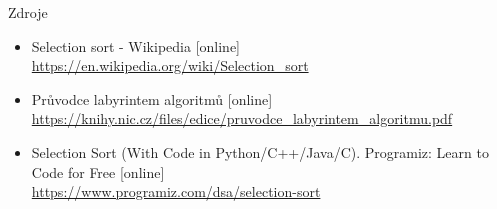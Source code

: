 \documentclass{beamer}
\begin{document}
\begin{frame}{Zdroje}
\begin{itemize}
    \item Selection sort - Wikipedia [online]\\
    \url{https://en.wikipedia.org/wiki/Selection_sort}
    \item Průvodce labyrintem algoritmů [online]\\
    \url{https://knihy.nic.cz/files/edice/pruvodce_labyrintem_algoritmu.pdf}
    \item Selection Sort (With Code in Python/C++/Java/C). Programiz: Learn to Code for Free [online]\\
    \url{https://www.programiz.com/dsa/selection-sort}
\end{itemize}
\end{frame}
\end{document}
